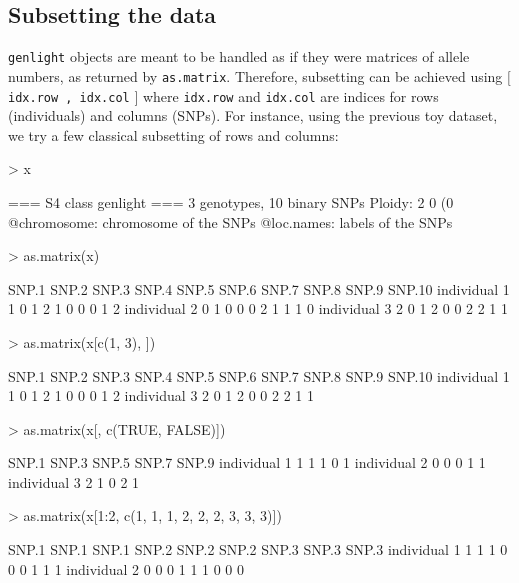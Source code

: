 \documentclass{article}
\begin{document}
\subsection{Subsetting the data}
\texttt{genlight} objects are meant to be handled as if they were matrices of allele numbers, as
returned by \texttt{as.matrix}.
Therefore, subsetting can be achieved using $[$ \texttt{idx.row , idx.col} $]$ where \texttt{idx.row}
and \texttt{idx.col} are indices for rows (individuals) and columns (SNPs).
For instance, using the previous toy dataset, we try a few classical subsetting of rows and columns:
\begin{Schunk}
\begin{Sinput}
> x
\end{Sinput}
\begin{Soutput}
 === S4 class genlight ===
 3 genotypes,  10 binary SNPs
 Ploidy: 2
 0 (0 %
 @chromosome: chromosome of the SNPs
 @loc.names: labels of the SNPs
\end{Soutput}
\begin{Sinput}
> as.matrix(x)
\end{Sinput}
\begin{Soutput}
             SNP.1 SNP.2 SNP.3 SNP.4 SNP.5 SNP.6 SNP.7 SNP.8 SNP.9 SNP.10
individual 1     1     0     1     2     1     0     0     0     1      2
individual 2     0     1     0     0     0     2     1     1     1      0
individual 3     2     0     1     2     0     0     2     2     1      1
\end{Soutput}
\begin{Sinput}
> as.matrix(x[c(1, 3), ])
\end{Sinput}
\begin{Soutput}
             SNP.1 SNP.2 SNP.3 SNP.4 SNP.5 SNP.6 SNP.7 SNP.8 SNP.9 SNP.10
individual 1     1     0     1     2     1     0     0     0     1      2
individual 3     2     0     1     2     0     0     2     2     1      1
\end{Soutput}
\begin{Sinput}
> as.matrix(x[, c(TRUE, FALSE)])
\end{Sinput}
\begin{Soutput}
             SNP.1 SNP.3 SNP.5 SNP.7 SNP.9
individual 1     1     1     1     0     1
individual 2     0     0     0     1     1
individual 3     2     1     0     2     1
\end{Soutput}
\begin{Sinput}
> as.matrix(x[1:2, c(1, 1, 1, 2, 2, 2, 3, 3, 3)])
\end{Sinput}
\begin{Soutput}
             SNP.1 SNP.1 SNP.1 SNP.2 SNP.2 SNP.2 SNP.3 SNP.3 SNP.3
individual 1     1     1     1     0     0     0     1     1     1
individual 2     0     0     0     1     1     1     0     0     0
\end{Soutput}
\end{Schunk}
\end{document}
